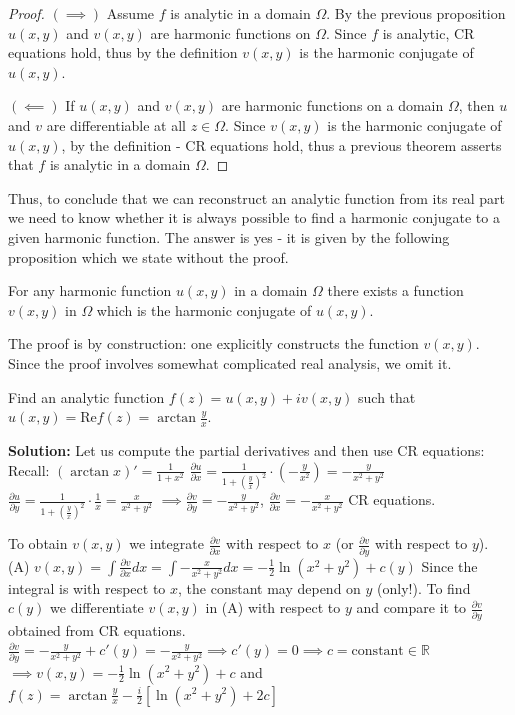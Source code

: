 \documentclass[12pt]{article}
\newcommand{\Rea}{\text{Re}}
\begin{document}
\begin{proof}
$(\implies)$ Assume $f$ is analytic in a domain $\Omega$. By the previous proposition $u(x,y)$ and $v(x,y)$ are harmonic functions on $\Omega$. Since $f$ is analytic, CR equations hold, thus by the definition $v(x,y)$ is the harmonic conjugate of $u(x,y)$.

$(\impliedby)$ If $u(x,y)$ and $v(x,y)$ are harmonic functions on a domain $\Omega$, then $u$ and $v$ are differentiable at all $z \in \Omega$. Since $v(x,y)$ is the harmonic conjugate of $u(x,y)$, by the definition - CR equations hold, thus a previous theorem asserts that $f$ is analytic in a domain $\Omega$.
\end{proof}

Thus, to conclude that we can reconstruct an analytic function from its real part we need to know whether it is always possible to find a harmonic conjugate to a given harmonic function. The answer is yes - it is given by the following proposition which we state without the proof.

\begin{proposition}
For any harmonic function $u(x,y)$ in a domain $\Omega$ there exists a function $v(x,y)$ in $\Omega$ which is the harmonic conjugate of $u(x,y)$.
\end{proposition}

The proof is by construction: one explicitly constructs the function $v(x,y)$. Since the proof involves somewhat complicated real analysis, we omit it.

\begin{example}
Find an analytic function $f(z) = u(x,y) + iv(x,y)$ such that $u(x,y) = \Rea f(z) = \arctan\frac{y}{x}$.

\textbf{Solution:} Let us compute the partial derivatives and then use CR equations: Recall: $(\arctan x)' = \frac{1}{1+x^2}$
$\frac{\partial u}{\partial x} = \frac{1}{1+(\frac{y}{x})^2} \cdot (-\frac{y}{x^2}) = -\frac{y}{x^2+y^2}$
$\frac{\partial u}{\partial y} = \frac{1}{1+(\frac{y}{x})^2} \cdot \frac{1}{x} = \frac{x}{x^2+y^2}$
$\implies \frac{\partial v}{\partial y} = -\frac{y}{x^2+y^2}$, $\frac{\partial v}{\partial x} = -\frac{x}{x^2+y^2}$ CR equations.

To obtain $v(x,y)$ we integrate $\frac{\partial v}{\partial x}$ with respect to $x$ (or $\frac{\partial v}{\partial y}$ with respect to $y$).
(A) $v(x,y) = \int \frac{\partial v}{\partial x} dx = \int -\frac{x}{x^2+y^2} dx = -\frac{1}{2}\ln(x^2 + y^2) + c(y)$
Since the integral is with respect to $x$, the constant may depend on $y$ (only!). To find $c(y)$ we differentiate $v(x,y)$ in (A) with respect to $y$ and compare it to $\frac{\partial v}{\partial y}$ obtained from CR equations.
$\frac{\partial v}{\partial y} = -\frac{y}{x^2+y^2} + c'(y) = -\frac{y}{x^2+y^2} \implies c'(y) = 0 \implies c = \text{constant} \in \mathbb{R}$
$\implies v(x,y) = -\frac{1}{2}\ln(x^2 + y^2) + c$ and $f(z) = \arctan\frac{y}{x} - \frac{i}{2}[\ln(x^2 + y^2) + 2c]$
\end{example}
\end{document}
